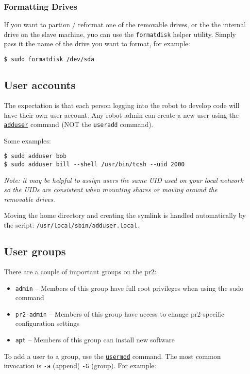\subsubsection{Formatting Drives}
If you want to partion / reformat one of the removable drives, or the
the internal drive on the slave machine, yuo can use the
\texttt{formatdisk} helper utility.  Simply pass it the name of the
drive you want to format, for example:
\begin{verbatim}
$ sudo formatdisk /dev/sda
\end{verbatim}

\subsection{User accounts}
\label{creating accounts}
The expectation is that each person logging into the robot to develop
code will have their own user account.  Any robot admin can create a
new user using the
\texttt{\href{http://unixhelp.ed.ac.uk/CGI/man-cgi?adduser}{adduser}}
command (NOT the \texttt{useradd} command).

Some examples:
\begin{verbatim}
$ sudo adduser bob
$ sudo adduser bill --shell /usr/bin/tcsh --uid 2000
\end{verbatim}

\textit{Note: it may be helpful to assign users the same UID used on
  your local network so the UIDs are consistent when mounting shares
  or moving around the removable drives.}

Moving the home directory and creating the symlink is handled
automatically by the script: \texttt{/usr/local/sbin/adduser.local}.

\subsection{User groups}
There are a couple of important groups on the pr2:
\begin{itemize}
\item \texttt{admin} -- Members of this group have full root privileges when using the sudo command
\item \texttt{pr2-admin} -- Members of this group have access to change pr2-specific configuration settings
\item \texttt{apt} -- Members of this group can install new software
\end{itemize}

To add a user to a group, use the \texttt{\href{http://unixhelp.ed.ac.uk/CGI/man-cgi?usermod}{usermod}} command.  The most
common invocation is \texttt{-a} (append) \texttt{-G} (group).  For example:

